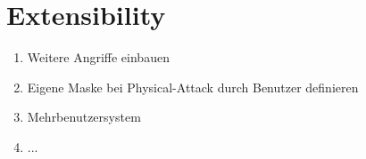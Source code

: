 
\section{Extensibility}

\begin{enumerate}
\item Weitere Angriffe einbauen
\item Eigene Maske bei Physical-Attack durch Benutzer definieren
\item Mehrbenutzersystem
\item ...
\end{enumerate}